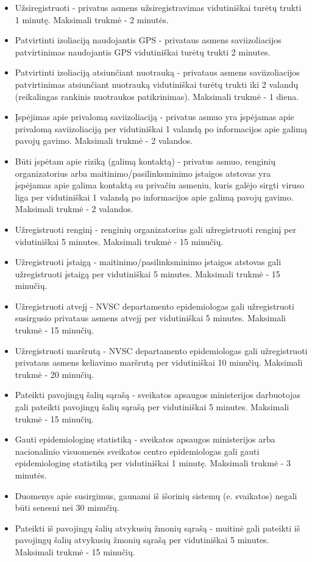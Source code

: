\documentclass{VUMIFPSkursinis}
\begin{document}
\begin{itemize}
	\item Užsiregistruoti - privatus asmens užsiregistravimas vidutiniškai turėtų trukti 1 minutę. Maksimali trukmė - 2 minutės.
	\item Patvirtinti izoliaciją naudojantis GPS - privataus asmens saviizoliacijos patvirtinimas naudojantis GPS vidutiniškai turėtų trukti 2 minutes.
	\item Patvirtinti izoliaciją atsiunčiant nuotrauką - privataus asmens saviizoliacijos patvirtinimas atsiunčiant nuotrauką vidutiniškai turėtų trukti iki 2 valandų (reikalingas rankinis nuotraukos patikrinimas). Maksimali trukmė - 1 diena.
	\item Įspėjimas apie privalomą saviizoliaciją - privatus asmuo yra įspėjamas apie privalomą saviizoliaciją per vidutiniškai 1 valandą po informacijos apie galimą pavojų gavimo. Maksimali trukmė - 2 valandos.
	\item Būti įspėtam apie riziką (galimą kontaktą) - privatus asmuo, renginių organizatorius arba maitinimo/pasilinksminimo įstaigos atstovas yra įspėjamas apie galima kontaktą su privačiu asmeniu, kuris galėjo sirgti viruso liga per vidutiniškai 1 valandą po informacijos apie galimą pavojų gavimo. Maksimali trukmė - 2 valandos.
	\item Užregistruoti renginį - renginių organizatorius gali užregistruoti renginį per vidutiniškai 5 minutes. Maksimali trukmė - 15 minučių.
	\item Užregistruoti įstaigą - maitinimo/pasilinksminimo įstaigos atstovas gali užregistruoti įstaigą per vidutiniškai 5 minutes. Maksimali trukmė - 15 minučių.
	\item Užregistruoti atvejį - NVSC departamento epidemiologas gali užregistruoti susirgusio privataus asmens atvejį per vidutiniškai 5 minutes. Maksimali trukmė - 15 minučių.
	\item Užregistruoti maršrutą - NVSC departamento epidemiologas gali užregistruoti privataus asmens keliavimo maršrutą per vidutiniškai 10 minučių. Maksimali trukmė - 20 minučių.
	\item Pateikti pavojingų šalių sąrašą - sveikatos apsaugos ministerijos darbuotojas gali pateikti pavojingų šalių sąrašą per vidutiniškai 5 minutes. Maksimali trukmė - 15 minučių.
	\item Gauti epidemiologinę statistiką - sveikatos apsaugos ministerijos arba nacionalinio visuomenės sveikatos centro epidemiologas gali gauti epidemiologinę statistiką per vidutiniškai 1 minutę. Maksimali trukmė - 3 minutės.
	\item Duomenys apie susirgimus, gaunami iš išorinių sistemų (e. svaikatos) negali būti senesni nei 30 minučių.
	\item Pateikti iš pavojingų šalių atvykusių žmonių sąrašą - muitinė gali pateikti iš pavojingų šalių atvykusių žmonių sąrašą per vidutiniškai 5 minutes. Maksimali trukmė - 15 minučių.
\end{itemize}
\end{document}
